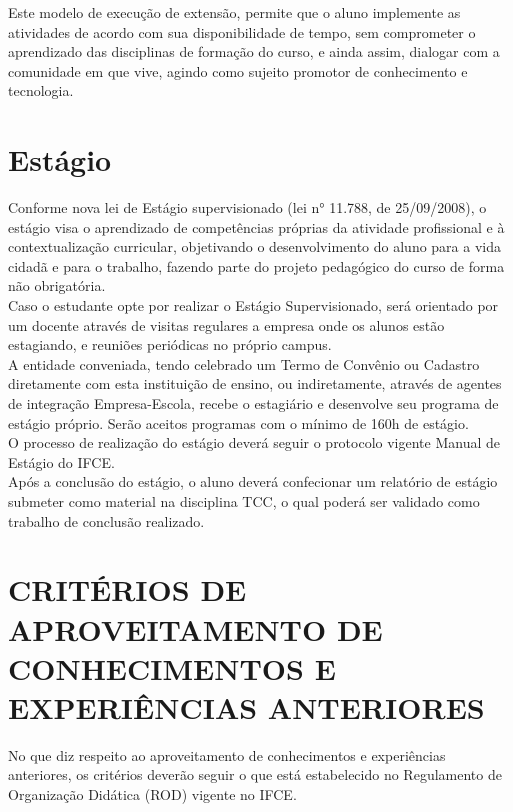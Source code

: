 Este modelo de execução de extensão, permite que o aluno implemente as atividades de acordo com sua disponibilidade de tempo, sem comprometer o aprendizado das disciplinas de formação do curso, e ainda assim, dialogar com a comunidade em que vive, agindo como sujeito promotor de conhecimento e tecnologia.\\

\chapter{Estágio}

Conforme nova lei de Estágio supervisionado (lei n° 11.788, de 25/09/2008), o estágio visa o aprendizado de competências próprias da atividade profissional e à contextualização curricular, objetivando o desenvolvimento do aluno para a vida cidadã e para o trabalho, fazendo parte do projeto pedagógico do curso de forma não obrigatória.\\

Caso o estudante opte por realizar o Estágio Supervisionado, será orientado por um docente através de visitas regulares a empresa onde os alunos estão estagiando, e reuniões periódicas no próprio campus.\\

A entidade conveniada, tendo celebrado um Termo de Convênio ou Cadastro diretamente com esta instituição de ensino, ou indiretamente, através de agentes de integração Empresa-Escola, recebe o estagiário e desenvolve seu programa de estágio próprio. Serão aceitos programas com o mínimo de 160h de estágio.\\

O processo de realização do estágio deverá seguir o protocolo vigente Manual de Estágio do IFCE.\\

Após a conclusão do estágio, o aluno deverá confecionar um relatório de estágio submeter como material na disciplina TCC, o qual poderá ser validado como trabalho de conclusão realizado.\\

\chapter{CRITÉRIOS DE APROVEITAMENTO DE CONHECIMENTOS E EXPERIÊNCIAS ANTERIORES}

No que diz respeito ao aproveitamento de conhecimentos e experiências anteriores, os critérios deverão seguir o que está estabelecido no Regulamento de Organização Didática (ROD) vigente no IFCE.\\

